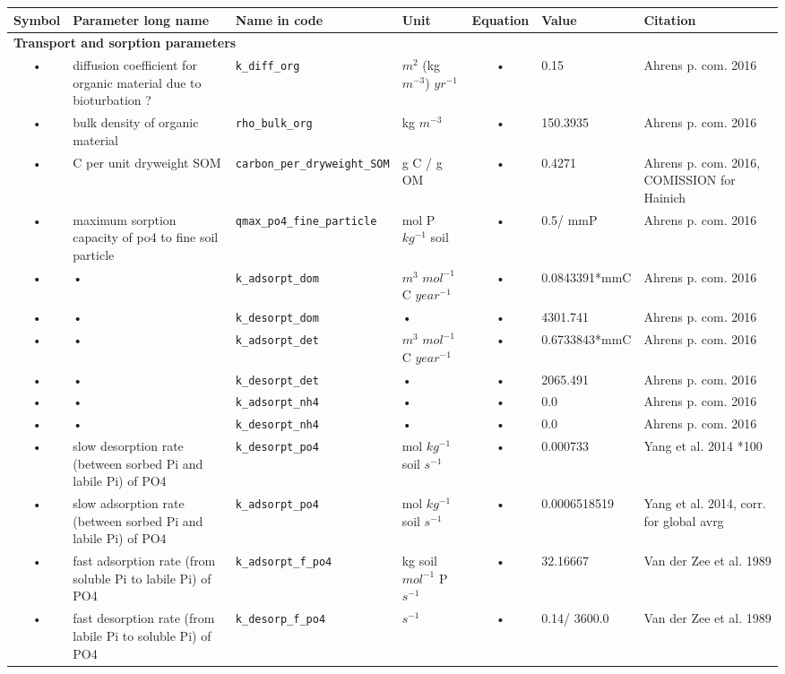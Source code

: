\begin{table}
\begin{tabularx}{\linewidth}{|c|X|l|l|c|l|X|} %
\hline 
Symbol & Parameter long name & Name in code & Unit & Equation & Value & Citation \\ 
\hline 

\multicolumn{6}{l}{\bf Transport and sorption parameters}\\
\hline
• & diffusion coefficient for organic material due to bioturbation ? & \texttt{k\_diff\_org} & $m^{2}$ (kg $m^{-3}$) $yr^{-1}$ & • & 0.15 & Ahrens p. com. 2016 \\
• & bulk density of organic material & \texttt{rho\_bulk\_org} & kg $m^{-3}$ & • & 150.3935 & Ahrens p. com. 2016 \\
• & C per unit dryweight SOM & \texttt{carbon\_per\_dryweight\_SOM} & g C / g OM & • & 0.4271 & Ahrens p. com. 2016, COMISSION for Hainich \\
• & maximum sorption capacity of po4 to fine soil particle & \texttt{qmax\_po4\_fine\_particle} & mol P $kg^{-1}$ soil & • & 0.5/ mmP & Ahrens p. com. 2016 \\
• & • & \texttt{k\_adsorpt\_dom} & $m^{3}$ $mol^{-1}$ C $year^{-1}$ & • & 0.0843391*mmC & Ahrens p. com. 2016 \\
• & • & \texttt{k\_desorpt\_dom} & • & • & 4301.741 & Ahrens p. com. 2016 \\
• & • & \texttt{k\_adsorpt\_det} & $m^{3}$ $mol^{-1}$ C $year^{-1}$ & • & 0.6733843*mmC & Ahrens p. com. 2016 \\
• & • & \texttt{k\_desorpt\_det} & • & • & 2065.491 & Ahrens p. com. 2016 \\
• & • & \texttt{k\_adsorpt\_nh4} & • & • & 0.0 & Ahrens p. com. 2016 \\
• & • & \texttt{k\_desorpt\_nh4} & • & • & 0.0 & Ahrens p. com. 2016 \\
• & slow desorption rate (between sorbed Pi and labile Pi) of PO4 & \texttt{k\_desorpt\_po4} & mol $kg^{-1}$ soil $s^{-1}$ & • & 0.000733 & Yang et al. 2014 *100 \\
• & slow adsorption rate (between sorbed Pi and labile Pi) of PO4 & \texttt{k\_adsorpt\_po4} & mol $kg^{-1}$ soil $s^{-1}$ & • & 0.0006518519 & Yang et al. 2014, corr. for global avrg\\
• & fast adsorption rate (from soluble Pi to labile Pi) of PO4 & \texttt{k\_adsorpt\_f\_po4} & kg soil $mol^{-1}$ P $s^{-1}$ & • & 32.16667 & Van der Zee et al. 1989 \\
• & fast desorption rate (from labile Pi to soluble Pi) of PO4 & \texttt{k\_desorp\_f\_po4} & $s^{-1}$ & • & 0.14/ 3600.0 & Van der Zee et al. 1989 \\

\end{tabularx}
\end{table}
